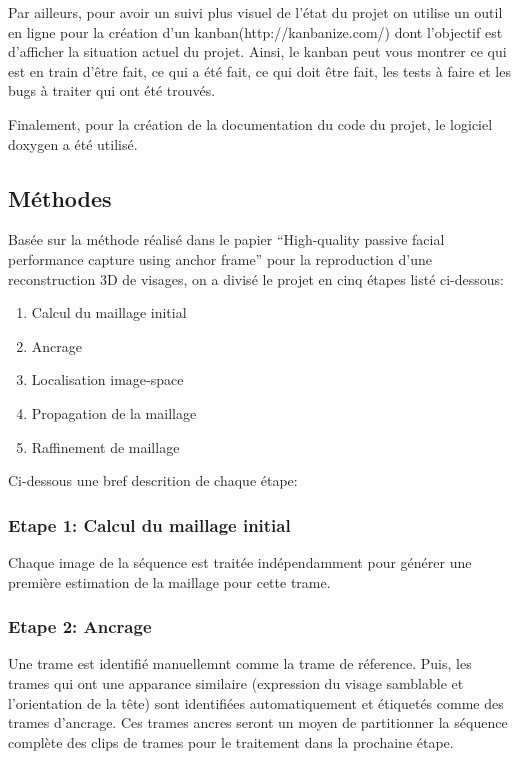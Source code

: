 \documentclass[a4paper,12pt]{article}
\begin{document}
Par ailleurs, pour avoir un suivi plus visuel de l’état du projet on
utilise un outil en ligne pour la création d’un
kanban(http://kanbanize.com/) dont l’objectif est d’afficher la
situation actuel du projet. Ainsi, le kanban peut vous montrer ce qui
est en train d’être fait, ce qui a été fait, ce qui doit être fait,
les tests à faire et les bugs à traiter qui ont été trouvés. 

Finalement, pour la création de la documentation du code du projet, le
logiciel doxygen a été utilisé.  


\subsection{Méthodes}

Basée sur la méthode réalisé dans le papier ``High-quality passive
facial performance capture using anchor
frame''\cite{Beeler:2011:HPF:2010324.1964970} pour la reproduction
d'une reconstruction 3D de visages, on a divisé le projet en cinq
étapes listé ci-dessous: 

\begin{enumerate}
\item Calcul du maillage initial
\item Ancrage
\item Localisation image-space
\item Propagation de la maillage
\item Raffinement de maillage
\end{enumerate}

Ci-dessous une bref descrition de chaque étape:

\subsubsection*{Etape 1: Calcul du maillage initial}
Chaque image de la séquence est traitée indépendamment pour générer
une première estimation de la maillage pour cette trame. 

\subsubsection*{Etape 2: Ancrage}
Une trame est identifié manuellemnt comme la trame de réference. Puis,
les trames qui ont une apparance similaire (expression du visage
samblable et l'orientation de la tête) sont identifiées
automatiquement et étiquetés comme des trames d'ancrage. Ces trames
ancres seront un moyen de partitionner la séquence complète des clips
de trames pour le traitement dans la prochaine étape. 
\end{document}
